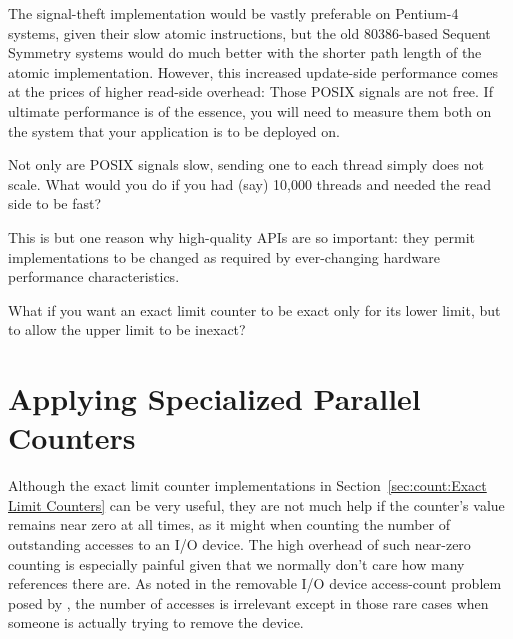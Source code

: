 The signal-theft implementation would be vastly preferable on Pentium-4
systems, given their slow atomic instructions, but the old 80386-based
Sequent Symmetry systems would do much better with the shorter path
length of the atomic implementation.
However, this increased update-side performance comes at the
prices of higher read-side overhead: Those POSIX signals are not free.
If ultimate performance is of the essence, you will need to measure
them both on the system that your application is to be deployed on.

\QuickQuiz{}
	Not only are POSIX signals slow, sending one to each thread
	simply does not scale.
	What would you do if you had (say) 10,000 threads and needed
	the read side to be fast?
 \QuickQuizEnd

This is but one reason why high-quality APIs are so important:
they permit implementations to be changed as required by ever-changing
hardware performance characteristics.

\QuickQuiz{}
	What if you want an exact limit counter to be exact only for
	its lower limit, but to allow the upper limit to be inexact?
 \QuickQuizEnd

\section{Applying Specialized Parallel Counters}
\label{sec:count:Applying Specialized Parallel Counters}

Although the exact limit counter implementations in
Section~\ref{sec:count:Exact Limit Counters}
can be very useful, they are not much help if the counter's value
remains near zero at all times, as it might when counting the number
of outstanding accesses to an I/O device.
The high overhead of such near-zero counting is especially painful
given that we normally don't care how many references there are.
As noted in the removable I/O device access-count problem posed by
{\QQIOcnt},
the number of accesses is irrelevant except in those rare cases when
someone is actually trying to remove the device.

